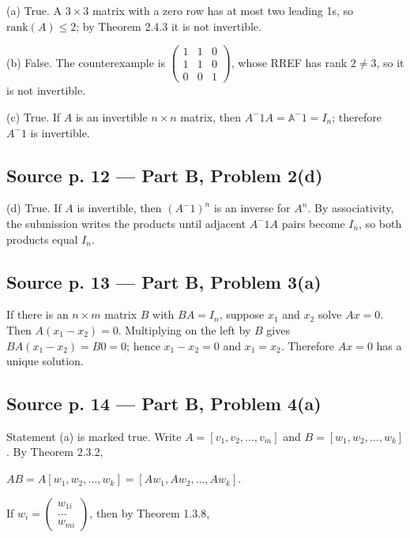 (a) True. A \(3 \times 3\) matrix with a zero row has at most two leading 1s, so \(\text{rank}(A) \leq 2\); by Theorem 2.4.3 it is not invertible.

(b) False. The counterexample is \(\begin{pmatrix}
1 & 1 & 0 \\
1 & 1 & 0 \\
0 & 0 & 1
\end{pmatrix}\), whose RREF has rank \(2 \neq 3\), so it is not invertible.

(c) True. If \(A\) is an invertible \(n \times n\) matrix, then \(A^{-}1A = \mathbb{A}^{-}1 = I_{n}\); therefore \(A^{-}1\) is invertible.

\subsection{Source p. 12 --- Part B, Problem 2(d)}

(d) True. If \(A\) is invertible, then \(\left( {A^{-}1} \right)^{n}\) is an inverse for \(A^{n}\). By associativity, the submission writes the products until adjacent \(A^{-}1A\) pairs become \(I_{n}\), so both products equal \(I_{n}\).

\subsection{Source p. 13 --- Part B, Problem 3(a)}

If there is an \(n \times m\) matrix \(B\) with \(BA = I_{n}\), suppose \(x_{1}\) and \(x_{2}\) solve \(Ax = 0\). Then \(A\left( {x_{1} - x_{2}} \right) = 0\). Multiplying on the left by \(B\) gives \(BA\left( {x_{1} - x_{2}} \right) = B0 = 0\); hence \(x_{1} - x_{2} = 0\) and \(x_{1} = x_{2}\). Therefore \(Ax = 0\) has a unique solution.

\subsection{Source p. 14 --- Part B, Problem 4(a)}

Statement (a) is marked true. Write \(A = \left\lbrack {v_{1},v_{2},\ldots,v_{m}} \right\rbrack\) and \(B = \left\lbrack {w_{1},w_{2},\ldots,w_{k}} \right\rbrack\). By Theorem 2.3.2,

\(AB = A\left\lbrack {w_{1},w_{2},\ldots,w_{k}} \right\rbrack = \left\lbrack {Aw_{1},Aw_{2},\ldots,Aw_{k}} \right\rbrack\).

If \(w_{i} = \begin{pmatrix}
w_{1i} \\
\ldots \\
w_{mi}
\end{pmatrix}\), then by Theorem 1.3.8,

